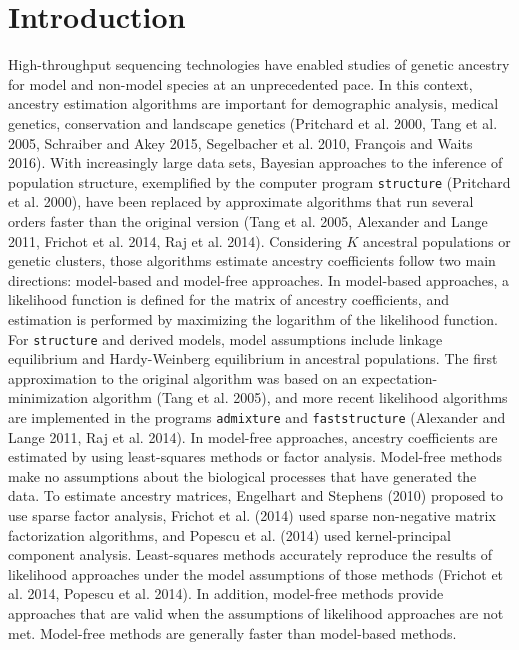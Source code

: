 \section{Introduction}

 High-throughput sequencing technologies have enabled studies of genetic ancestry for model and non-model species at an unprecedented pace. In this  context, ancestry estimation algorithms are important for demographic analysis, medical genetics, conservation and landscape genetics (Pritchard et al. 2000, Tang et al. 2005, Schraiber and Akey 2015, Segelbacher et al. 2010, Fran\c cois and Waits 2016).  With increasingly large data sets, Bayesian approaches to the inference of population structure, exemplified by the computer program {\tt structure} (Pritchard et al. 2000), have been replaced by approximate algorithms that run several orders faster than the original version (Tang et al. 2005, Alexander and Lange 2011, Frichot et al. 2014, Raj et al. 2014).  Considering $K$ ancestral populations or genetic clusters, those algorithms estimate ancestry coefficients follow two main directions: model-based and model-free approaches. In model-based approaches, a likelihood function is defined for the matrix of ancestry coefficients, and estimation is performed by maximizing the logarithm of the likelihood function. For {\tt structure} and derived models, model assumptions include linkage equilibrium and Hardy-Weinberg equilibrium in ancestral populations. The first approximation to the original algorithm was based on an expectation-minimization algorithm (Tang et al. 2005), and more recent likelihood algorithms are implemented in the programs {\tt admixture}  and {\tt faststructure} (Alexander and Lange 2011, Raj et al. 2014). In model-free approaches, ancestry coefficients are estimated by using least-squares methods or factor analysis. Model-free methods make no assumptions about the biological processes that have generated the data. To estimate ancestry matrices, Engelhart and Stephens (2010) proposed to use sparse factor analysis, Frichot et al. (2014) used sparse non-negative matrix factorization algorithms, and Popescu et al. (2014) used kernel-principal component analysis. Least-squares methods accurately reproduce the results of likelihood approaches under the model assumptions of those methods (Frichot et al. 2014, Popescu et al. 2014).  In addition, model-free methods provide approaches that are valid when the assumptions of likelihood approaches are not met. Model-free methods are generally faster than model-based methods. 
   
